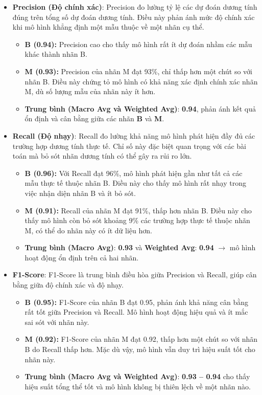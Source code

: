 \begin{itemize}
	\item \textbf{Precision (Độ chính xác)}:  
	Precision đo lường tỷ lệ các dự đoán dương tính đúng trên tổng số dự đoán dương tính. Điều này phản ánh mức độ chính xác khi mô hình khẳng định một mẫu thuộc về một nhãn cụ thể.
	\begin{itemize}
		\item \textbf{B (0.94):} Precision cao cho thấy mô hình rất ít dự đoán nhầm các mẫu khác thành nhãn B.
		\item \textbf{M (0.93):} Precision của nhãn M đạt 93\%, chỉ thấp hơn một chút so với nhãn B. Điều này chứng tỏ mô hình có khả năng xác định chính xác nhãn M, dù số lượng mẫu của nhãn này ít hơn.
		\item \textbf{Trung bình (Macro Avg và Weighted Avg)}: \textbf{0.94}, phản ánh kết quả ổn định và cân bằng giữa các nhãn \textbf{B} và \textbf{M}.
	\end{itemize}
	
	\item \textbf{Recall (Độ nhạy)}:  
	Recall đo lường khả năng mô hình phát hiện đầy đủ các trường hợp dương tính thực tế. Chỉ số này đặc biệt quan trọng với các bài toán mà bỏ sót nhãn dương tính có thể gây ra rủi ro lớn.
	\begin{itemize}
		\item \textbf{B (0.96):} Với Recall đạt 96\%, mô hình phát hiện gần như tất cả các mẫu thực tế thuộc nhãn B. Điều này cho thấy mô hình rất nhạy trong việc nhận diện nhãn B và ít bỏ sót.
		\item \textbf{M (0.91):} Recall của nhãn M đạt 91\%, thấp hơn nhãn B. Điều này cho thấy mô hình còn bỏ sót khoảng 9\% các trường hợp thực tế thuộc nhãn M, có thể do nhãn này có ít dữ liệu hơn.
		\item \textbf{Trung bình (Macro Avg)}: \textbf{0.93} và \textbf{Weighted Avg}: \textbf{0.94} $\rightarrow$ mô hình hoạt động ổn định trên cả hai nhãn.
	\end{itemize}
	
	\item \textbf{F1-Score}:  
	F1-Score là trung bình điều hòa giữa Precision và Recall, giúp cân bằng giữa độ chính xác và độ nhạy.
	\begin{itemize}
		\item \textbf{B (0.95):} F1-Score của nhãn B đạt 0.95, phản ánh khả năng cân bằng rất tốt giữa Precision và Recall. Mô hình hoạt động hiệu quả và ít mắc sai sót với nhãn này.
		\item \textbf{M (0.92):} F1-Score của nhãn M đạt 0.92, thấp hơn một chút so với nhãn B do Recall thấp hơn. Mặc dù vậy, mô hình vẫn duy trì hiệu suất tốt cho nhãn này.
		\item \textbf{Trung bình (Macro Avg và Weighted Avg)}: \textbf{0.93 -- 0.94} cho thấy hiệu suất tổng thể tốt và mô hình không bị thiên lệch về một nhãn nào.
	\end{itemize}
	

\end{itemize}

